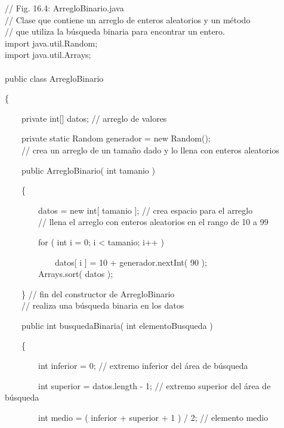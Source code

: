 {
\ttfamily \small

\noindent
// Fig. 16.4: ArregloBinario.java\\
// Clase que contiene un arreglo de enteros aleatorios y un método \\
// que utiliza la búsqueda binaria para encontrar un entero.\\
import java.util.Random;\\
import java.util.Arrays;\\
\\
public class ArregloBinario

\noindent \{

\noindent \ \ \ \ private int[] datos; // arreglo de valores

\noindent \ \ \ \ private static Random generador = new Random();\\

\noindent \ \ \ \ // crea un arreglo de un tamaño dado y lo llena con enteros aleatorios

\noindent \ \ \ \ public ArregloBinario( int tamanio )

\noindent \ \ \ \ \{

\noindent \ \ \ \ \ \ \ \ datos = new int[ tamanio ]; // crea espacio para el arreglo\\

\noindent \ \ \ \ \ \ \ \ // llena el arreglo con enteros aleatorios en el rango de 10 a 99

\noindent \ \ \ \ \ \ \ \ for ( int i = 0; i < tamanio; i++ )

\noindent \ \ \ \ \ \ \ \ \ \ \ \ datos[ i ] = 10 + generador.nextInt( 90 );\\

\noindent \ \ \ \ \ \ \ \ Arrays.sort( datos );

\noindent \ \ \ \ \} // fin del constructor de ArregloBinario\\

\noindent \ \ \ \ // realiza una búsqueda binaria en los datos

\noindent \ \ \ \ public int busquedaBinaria( int elementoBusqueda )

\noindent \ \ \ \ \{

\noindent \ \ \ \ \ \ \ \ int inferior = 0; // extremo inferior del área de búsqueda

\noindent \ \ \ \ \ \ \ \ int superior = datos.length - 1; // extremo superior del área de búsqueda

\noindent \ \ \ \ \ \ \ \ int medio = ( inferior + superior + 1 ) / 2; // elemento medio

}
